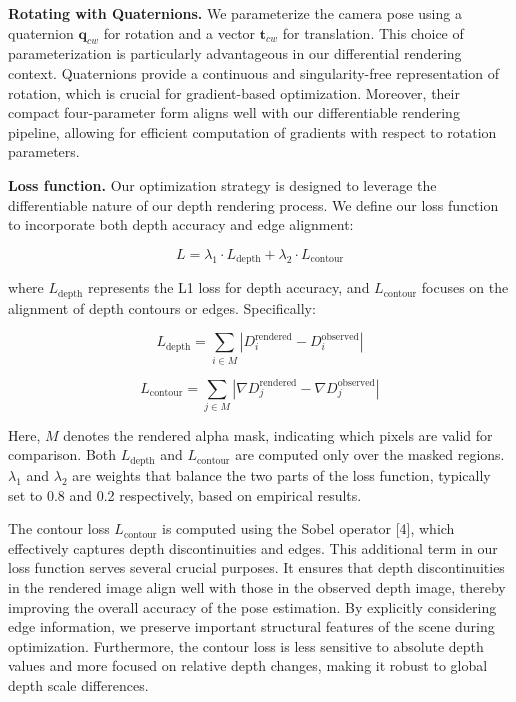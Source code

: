 \documentclass[twocolumn]{article} %
\begin{document}
\textbf{Rotating with Quaternions.} We parameterize the camera pose
using a quaternion \(\mathbf{q}_{cw}\) for rotation and a vector
\(\mathbf{t}_{cw}\) for translation. This choice of parameterization is
particularly advantageous in our differential rendering context.
Quaternions provide a continuous and singularity-free representation of
rotation, which is crucial for gradient-based optimization. Moreover,
their compact four-parameter form aligns well with our differentiable
rendering pipeline, allowing for efficient computation of gradients with
respect to rotation parameters.

\textbf{Loss function.} Our optimization strategy is designed to
leverage the differentiable nature of our depth rendering process. We
define our loss function to incorporate both depth accuracy and edge
alignment:

\[
L = \lambda_1 \cdot L_{\text{depth}} + \lambda_2 \cdot L_{\text{contour}}
\]

where \(L_{\text{depth}}\) represents the L1 loss for depth accuracy,
and \(L_{\text{contour}}\) focuses on the alignment of depth contours or
edges. Specifically:

\[
L_{\text{depth}} = \sum_{i \in M} |D_i^{\text{rendered}} - D_i^{\text{observed}}|
\]

\[
L_{\text{contour}} = \sum_{j \in M} |\nabla D_j^{\text{rendered}} - \nabla D_j^{\text{observed}}|
\]

Here, \(M\) denotes the rendered alpha mask, indicating which pixels are
valid for comparison. Both \(L_{\text{depth}}\) and
\(L_{\text{contour}}\) are computed only over the masked regions.
\(\lambda_1\) and \(\lambda_2\) are weights that balance the two parts
of the loss function, typically set to 0.8 and 0.2 respectively, based
on empirical results.

The contour loss \(L_{\text{contour}}\) is computed using the Sobel
operator {[}4{]}, which effectively captures depth discontinuities and
edges. This additional term in our loss function serves several crucial
purposes. It ensures that depth discontinuities in the rendered image
align well with those in the observed depth image, thereby improving the
overall accuracy of the pose estimation. By explicitly considering edge
information, we preserve important structural features of the scene
during optimization. Furthermore, the contour loss is less sensitive to
absolute depth values and more focused on relative depth changes, making
it robust to global depth scale differences.
\end{document}
